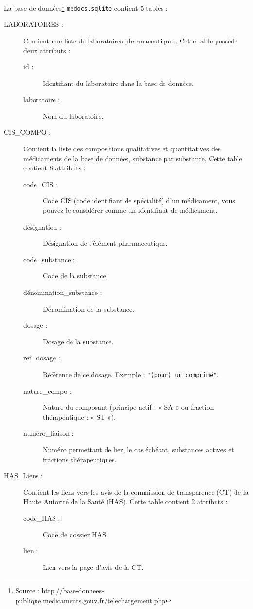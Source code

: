 
La base de données\footnote{Source : http://base-donnees-publique.medicaments.gouv.fr/telechargement.php} \texttt{medocs.sqlite} contient 5 tables : 

\begin{description}
  \item[LABORATOIRES :] Contient une liste de laboratoires pharmaceutiques. Cette table possède deux attributs : 
    \begin{description}
      \item[id :] Identifiant du laboratoire dans la base de données.
      \item[laboratoire :] Nom du laboratoire.
    \end{description}
  \item[CIS\_COMPO :] Contient la liste des compositions qualitatives et quantitatives des médicaments de la base de données, substance par substance. Cette table contient 8 attributs :
    \begin{description}
      \item[code\_CIS :] Code CIS (code identifiant de spécialité) d'un médicament, vous pouvez le considérer comme un identifiant de médicament. 
      \item[désignation :] Désignation de l'élément pharmaceutique. 
      \item[code\_substance :] Code de la substance.
      \item[dénomination\_substance :] Dénomination de la substance. 
      \item[dosage :] Dosage de la substance. 
      \item[ref\_dosage :] Référence de ce dosage. Exemple : \texttt{"(pour) un comprimé"}.
      \item[nature\_compo :]   Nature du composant (principe actif : « SA » ou fraction thérapeutique : « ST »).
      \item[numéro\_liaison :]  Numéro permettant de lier, le cas échéant, substances actives et fractions thérapeutiques.
    \end{description}
  \item[HAS\_Liens :] Contient les liens vers les avis de la commission de transparence (CT) de la Haute Autorité de la Santé (HAS). Cette table contient 2 attributs : 
    \begin{description}
      \item[code\_HAS :] Code de dossier HAS. 
      \item[lien :] Lien vers la page d'avis de la CT.
    \end{description}

\end{description}
